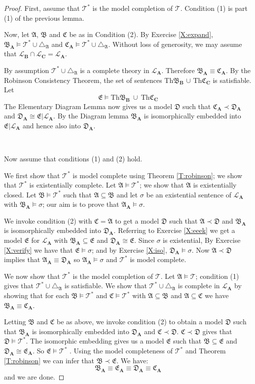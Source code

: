 \documentclass[titlepage, oneside]{amsbook}
\theoremstyle{plain}
\theoremstyle{definition}
\theoremstyle{remark}
\newcommand{\tria}[1]{\ensuremath{\triangle_{\mathfrak{#1}}}}
\newcommand{\theory}{\ensuremath{\mathcal{T}}}
\newcommand{\tee}{\ensuremath{\mathcal{T}}}
\newcommand{\tst}{\ensuremath{\mathcal{T}^{\ast}}}
\newcommand{\tstar}{\ensuremath{\mathcal{T}^{\ast}}}
\newcommand{\lan}{\ensuremath{\mathcal{L}}}
\newcommand{\seq}{\ensuremath{\subseteq}}
\newcommand{\ma}{\ensuremath{\mathfrak{A}}}
\newcommand{\mb}{\ensuremath{\mathfrak{B}}}
\newcommand{\mc}{\ensuremath{\mathfrak{C}}}
\newcommand{\md}{\ensuremath{\mathfrak{D}}}
\newcommand{\me}{\ensuremath{\mathfrak{E}}}
\newcommand{\ba}{\ensuremath{\mathbf{A}}}
\newcommand{\bb}{\ensuremath{\mathbf{B}}}
\newcommand{\bc}{\ensuremath{\mathbf{C}}}
\begin{document}
\begin{proof} First, assume that $\theory^{\ast}$ is the model completion of $\theory$. Condition (1) is part (1) of the previous lemma.

Now, let $\ma$, $\mb$ and $\mc$ be as in Condition (2).  By Exercise \ref{X:expand}, $\mb_\ba \models \tstar \cup \tria A$ and $\mc_\ba \models \tstar \cup \tria A$.
Without loss of generosity, we may assume that $\lan_\bb \cap \lan_\bc = \lan_\ba$.

By assumption $\tstar \cup \tria A$ is a complete theory in $\lan_\ba$.
Therefore $\mb_\ba \equiv \mc_\ba$. By the Robinson Consistency Theorem, the set 
of sentences Th$\mb_\bb$ $\cup$ Th$\mc_\bc$ is satisfiable. Let
	\[
   \me \models \mbox{Th}\mb_\bb \ \cup \ \mbox{Th}\mc_\bc
	\]
The Elementary Diagram Lemma now gives us a model $\md$ such that 
$\mc_\ba \prec \md_\ba$ and $\md_\ba \cong \me |\lan _\ba$. By the Diagram lemma $\mb_\ba$ is isomorphically embedded into $\me |\lan_\ba$ and hence also into $\md_\ba$.

\

Now assume that conditions (1) and (2) hold. 

We first show that $\tstar$ is model complete using
Theorem \ref{T:robinson}; we show that $\tstar$ is existentially complete.
Let $\ma \models \tstar$; we show that $\ma$ is existentially closed.  Let
$\mb \models \tstar$ such that $\ma \seq \mb$ and let $\sigma$ 
be an existential sentence of $\lan_\ba$ with $\mb_\ba \models \sigma$;
our aim is to prove that $\ma_\ba \models \sigma$.

We invoke condition (2) with $\mc = \ma$ to get a model $\md$ such that $\ma \prec \md$ and    $\mb_\ba $ is isomorphically embedded into $\md_\ba$. Referring to Exercise \ref{X:eeek} we get a model $\me$ for $\lan _{\ba}$ with 
$\mb _\ba \subseteq \me $ and $\md _\ba \cong \me$.
Since $\sigma$ is existential, By Exercise \ref{X:verify} we have that 
$\me \models \sigma $; and by Exercise \ref{X:iso}, $\md _{\ba} \models \sigma $.
Now $\ma \prec \md$ implies that $\ma_\ba \equiv \md_\ba$ so 
$\ma_\ba \models \sigma$ and $ \tstar$ is model complete.

We now show that $\tstar$ is the model completion of $\tee$.  Let $\ma
\models \theory$; condition (1) gives that $\tstar \cup \tria{A}$  is
satisfiable. We show that $\tstar \cup \tria A$  is
complete in $\lan_\ba$ by showing that for each $\mb \models
\theory^{\ast}$ and $\mc \models \tstar$ with $\ma \seq \mb$  and $\ma
\seq \mc$ we have $\mb_\ba \equiv \mc_\ba$.

Letting $\mb$ and $\mc$ be as above, we invoke condition (2) to obtain a 
model $\md$ such that $\mb_\ba$
is isomorphically embedded into $\md_\ba$ and $\mc \prec \md$.  $\mc
\prec \md$  gives that $\md \models \tstar$. The isomorphic
embedding gives us a model $\me$ such that $\mb \seq \me$ and $\md_\ba
\cong \me_\ba$. So $\me \models \tstar$ . Using the model
completeness of $\tst$ and Theorem \ref{T:robinson} we can infer that
$\mb \prec \me$. We have:
\[ \mb_\ba \equiv \me_\ba \equiv \md_\ba \equiv \mc_\ba\]
and we are done.
\end{proof}
\end{document}
